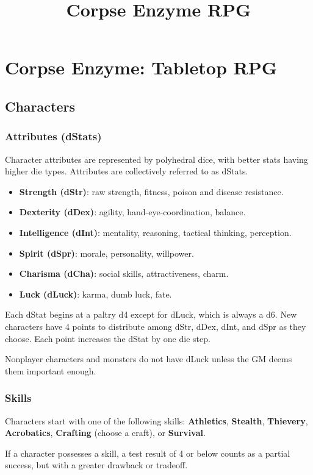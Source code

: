 \documentclass[10pt,twoside,twocolumn,openany]{book}
\begin{document}
\selectfont %

\title{Corpse Enzyme RPG}


\chapter{Corpse Enzyme: Tabletop RPG}
\section{Characters}
\subsection{Attributes (dStats)}
Character attributes are represented by polyhedral dice, with better stats having higher die types. Attributes are collectively referred to as dStats.
\begin{itemize}
\item \textbf{Strength (dStr)}: raw strength, fitness, poison and disease resistance.
\item \textbf{Dexterity (dDex)}: agility, hand-eye-coordination, balance.
\item \textbf{Intelligence (dInt)}: mentality, reasoning, tactical thinking, perception.
\item \textbf{Spirit (dSpr)}: morale, personality, willpower.
\item \textbf{Charisma (dCha)}: social skills, attractiveness, charm.
\item \textbf{Luck (dLuck)}: karma, dumb luck, fate.
\end{itemize}

Each dStat begins at a paltry d4 except for dLuck, which is always a d6. New characters have 4 points to distribute among dStr, dDex, dInt, and dSpr as they choose. Each point increases the dStat by one die step.
\par Nonplayer characters and monsters do not have dLuck unless the GM deems them important enough.

\subsection{Skills}
Characters start with one of the following skills:
\textbf{Athletics}, \textbf{Stealth}, \textbf{Thievery}, \textbf{Acrobatics}, \textbf{Crafting} (choose a craft), or \textbf{Survival}.
\par If a character possesses a skill, a test result of 4 or below counts as a partial success, but with a greater drawback or tradeoff.
\end{document}
